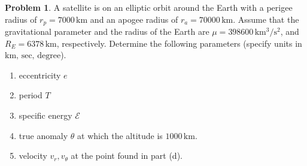 \documentclass[10pt]{article}
\theoremstyle{definition}
\newtheorem{prob}{Problem}[section]
\newenvironment{subprob}%
{\renewcommand{\theenumi}{\alph{enumi}}\renewcommand{\labelenumi}{(\theenumi)}\begin{enumerate}}%
{\end{enumerate}}%
\begin{document}
\begin{prob}
A satellite is on an elliptic orbit around the Earth with a perigee radius of $r_p=7000\,\mathrm{km}$ and an apogee radius of $r_a=70000\,\mathrm{km}$. Assume that the gravitational parameter and the radius of the Earth are $\mu=398600\,\mathrm{km^3/s^2}$, and $R_E=6378\,\mathrm{km}$, respectively. Determine the following parameters (specify units in $\mathrm{km},\,\mathrm{sec},\,\mathrm{degree}$). 
\begin{subprob}
\item eccentricity $e$
\item period $T$ 
\item specific energy $\mathcal{E}$
\item true anomaly $\theta$ at which the altitude is $1000\,\mathrm{km}$.
\item velocity $v_r,v_\theta$ at the point found in part (d).
\end{subprob}
\end{prob}

%
\end{document}
